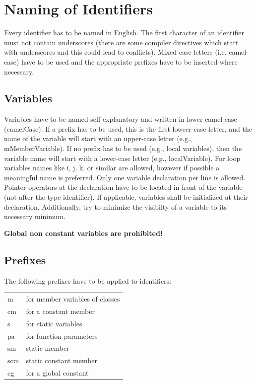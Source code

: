 \documentclass[final,a4paper,10pt, oneside]{article}
\begin{document}
\section{Naming of Identifiers}
Every identifier has to be named in English. 
The first character of an identifier must not contain underscores (there are some compiler directives which start with underscores and this could lead to conflicts). 
Mixed case letters (i.e. camel-case) have to be used and the appropriate prefixes have to be inserted where necessary.


\subsection{Variables}
Variables have to be named self explanatory and written in lower camel case (camelCase).
If a prefix has to be used, this is the first loweer-case letter, and the name of the variable will start with an upper-case letter (e.g., mMemberVariable).
If no prefix has to be used (e.g., local variables), then the variable name will start with a lower-case letter (e.g., localVariable).
For loop variables names like i, j, k, or similar are allowed, however if possible a meaningful name is preferred.
Only one variable declaration per line is allowed.
Pointer operators at the declaration have to be located in front of the variable (not after the type identifier).
If applicable, variables shall be initialized at their declaration.
Additionally, try to minimize the visibilty of a variable to its necessary minimum.

\textbf{Global non constant variables are prohibited!}

\subsection{Prefixes}
The following prefixes have to be applied to identifiers:\\

\begin{tabular}{ll}
m & for member variables of classes\\
cm & for a constant member\\	
s & for static variables\\ 	
pa & for function parameters\\
sm & static member\\
scm & static constant member\\
cg & for a global constant\\
\end{tabular}	\vspace{5mm}\\
\end{document}

